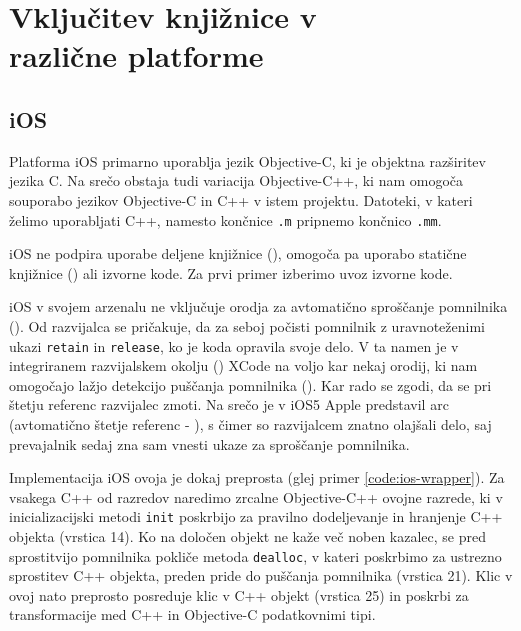 \chapter[Vključitev knjižnice v različne platforme]{Vključitev knjižnice v \\ različne platforme}
\label{chap:cross-platform}

\section{iOS}

Platforma iOS primarno uporablja jezik Objective-C, ki je objektna razširitev jezika C. Na srečo obstaja tudi variacija Objective-C++, ki nam omogoča souporabo jezikov Objective-C in C++ v istem projektu. Datoteki, v kateri želimo uporabljati C++, namesto končnice \texttt{.m} pripnemo končnico \texttt{.mm}.

iOS ne podpira uporabe deljene knjižnice (), omogoča pa uporabo statične knjižnice () ali izvorne kode. Za prvi primer izberimo uvoz izvorne kode.

iOS v svojem arzenalu ne vključuje orodja za avtomatično sproščanje pomnilnika (). Od razvijalca se pričakuje, da za seboj počisti pomnilnik z uravnoteženimi ukazi \texttt{retain} in \texttt{release}, ko je koda opravila svoje delo. V ta namen je v integriranem razvijalskem okolju () XCode na voljo kar nekaj orodij, ki nam omogočajo lažjo detekcijo puščanja pomnilnika (). Kar rado se zgodi, da se pri štetju referenc razvijalec zmoti. Na srečo je v iOS5 Apple predstavil \gls{arc} (avtomatično štetje referenc - ), s čimer so razvijalcem znatno olajšali delo, saj prevajalnik sedaj zna sam vnesti ukaze za sproščanje pomnilnika.

Implementacija iOS ovoja je dokaj preprosta (glej primer \ref{code:ios-wrapper}). Za vsakega C++ od razredov naredimo zrcalne Objective-C++ ovojne razrede, ki v inicializacijski metodi \texttt{init} poskrbijo za pravilno dodeljevanje in hranjenje C++ objekta (vrstica 14). Ko na določen objekt ne kaže več noben kazalec, se pred sprostitvijo pomnilnika pokliče metoda \texttt{dealloc}, v kateri poskrbimo za ustrezno sprostitev C++ objekta, preden pride do puščanja pomnilnika (vrstica 21). Klic v ovoj nato preprosto posreduje klic v C++ objekt (vrstica 25) in poskrbi za transformacije med C++ in Objective-C podatkovnimi tipi.

